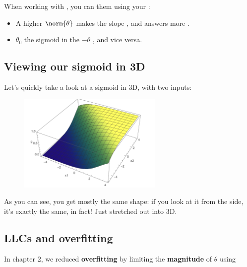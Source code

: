         \begin{concept}
            When working with , you can  them using your :\\
            
            \begin{itemize}
                \item A higher  $\norm{\theta}$ makes the slope , and answers more .
                
                \item {} $\theta_0$  the sigmoid in the $-\theta$ , and vice versa.
            \end{itemize}
        \end{concept}
        
    \subsection{Viewing our sigmoid in 3D}
        
        Let's quickly take a look at a sigmoid in 3D, with two inputs:
        
        \begin{figure}[H]
            \centering
            \includegraphics[width=70mm,scale=0.5]{images/classification_images/llc_3d.png}
        \end{figure}
        
        As you can see, you get mostly the same shape: if you look at it from the side, it's exactly the same, in fact! Just stretched out into 3D.
        
    \subsection{LLCs and overfitting}
    
        In chapter 2, we reduced \textbf{overfitting} by limiting the \textbf{magnitude} of $\theta$ using
        
